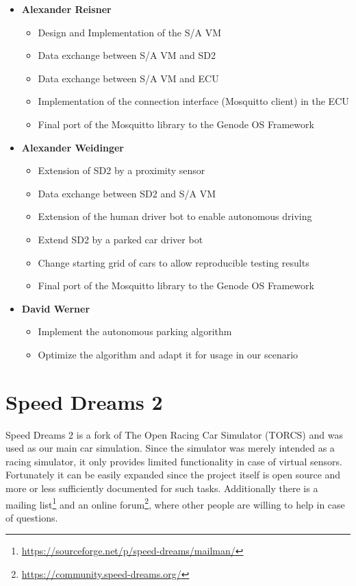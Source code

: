 \documentclass[paper=a4, fontsize=11pt]{scrreprt}
\begin{document}
\begin{itemize}
  \item \textbf{Alexander Reisner}
  \begin{itemize}
    \item Design and Implementation of the S/A VM
    \item Data exchange between S/A VM and SD2
    \item Data exchange between S/A VM and ECU
    \item Implementation of the connection interface (Mosquitto client) in the ECU
    \item Final port of the Mosquitto library to the Genode OS Framework
  \end{itemize}
  \item \textbf{Alexander Weidinger}
  \begin{itemize}
    \item Extension of SD2 by a proximity sensor
    \item Data exchange between SD2 and S/A VM
    \item Extension of the human driver bot to enable autonomous driving
    \item Extend SD2 by a parked car driver bot
    \item Change starting grid of cars to allow reproducible testing results
    \item Final port of the Mosquitto library to the Genode OS Framework
  \end{itemize}
  \item \textbf{David Werner}
  \begin{itemize}
    \item Implement the autonomous parking algorithm
    \item Optimize the algorithm and adapt it for usage in our scenario
  \end{itemize}
\end{itemize}

\chapter{Speed Dreams 2}
Speed Dreams 2 is a fork of The Open Racing Car Simulator (TORCS)
and was used as our main car simulation.
Since the simulator was merely intended as a racing simulator,
it only provides limited functionality in case of virtual sensors.
Fortunately it can be easily expanded since the project itself is open source
and more or less sufficiently documented for such tasks.
Additionally there is a mailing list\footnote{\url{https://sourceforge.net/p/speed-dreams/mailman/}}
and an online forum\footnote{\url{https://community.speed-dreams.org/}},
where other people are willing to help in case of questions.
\end{document}

